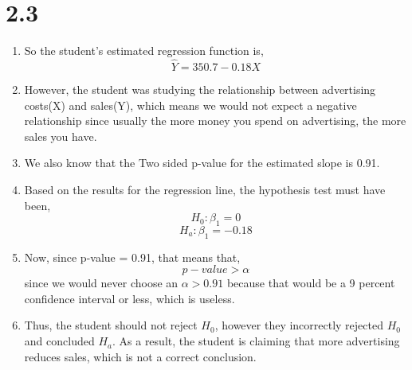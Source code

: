 \documentclass{article}
\begin{document}
\section*{2.3}
	\begin{enumerate}
		\item So the student's estimated regression function is,
		\[\hat{Y} = 350.7 -0.18X\]
		\item However, the student was studying the relationship between advertising costs(X) and sales(Y), which means we would not expect a negative relationship since usually the more money you spend on advertising, the more sales you have. 
		\item We also know that the Two sided p-value for the estimated slope is 0.91.
		\item Based on the results for the regression line, the hypothesis test must have been,
		\[H_0: \beta_1 = 0\]
		\[H_a: \beta_1 = -0.18\]
		\item Now, since p-value = 0.91, that means that,
		\[p-value > \alpha\] since we would never choose an $\alpha > 0.91$ because that would be a 9 percent confidence interval or less, which is useless.
		\item Thus, the student should not reject $H_0$, however they incorrectly rejected $H_0$ and concluded $H_a$. As a result, the student is claiming that more advertising reduces sales, which is not a correct conclusion.
	\end{enumerate}
\end{document}
